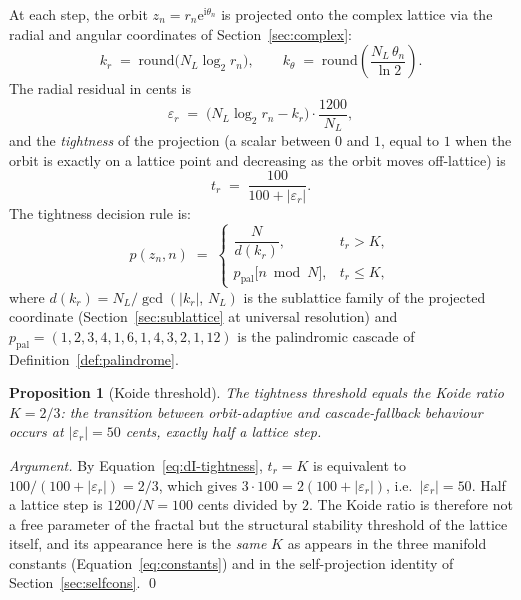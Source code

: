 \documentclass[11pt,a4paper]{article}
\newtheorem{proposition}[theorem]{Proposition}
\theoremstyle{definition}
\theoremstyle{remark}
\begin{document}
At each step, the orbit $z_{n}=r_{n}\mathrm{e}^{\mathrm{i}\theta_{n}}$ is projected onto the complex lattice via the radial and angular coordinates of Section~\ref{sec:complex}:
\begin{equation}
k_{r} \;=\; \mathrm{round}\bigl(N_{L}\log_{2}r_{n}\bigr), \qquad
k_{\theta} \;=\; \mathrm{round}\!\left(\frac{N_{L}\,\theta_{n}}{\ln 2}\right).
\end{equation}
The radial residual in cents is
\begin{equation}
\varepsilon_{r} \;=\; \bigl(N_{L}\log_{2}r_{n} - k_{r}\bigr)\cdot\frac{1200}{N_{L}},
\label{eq:dI-eps}
\end{equation}
and the \emph{tightness} of the projection (a scalar between $0$ and $1$, equal to $1$ when the orbit is exactly on a lattice point and decreasing as the orbit moves off-lattice) is
\begin{equation}
t_{r} \;=\; \frac{100}{100+|\varepsilon_{r}|}.
\label{eq:dI-tightness}
\end{equation}
The tightness decision rule is:
\[
p(z_{n},n) \;=\; \begin{cases}
\dfrac{N}{d(k_{r})}, & t_{r} > K, \\[0.8em]
p_{\mathrm{pal}}\!\bigl[n\bmod N\bigr], & t_{r} \leq K,
\end{cases}
\]
where $d(k_{r}) = N_{L}/\gcd(|k_{r}|,\,N_{L})$ is the sublattice family of the projected coordinate (Section~\ref{sec:sublattice} at universal resolution) and $p_{\mathrm{pal}}=(1,2,3,4,1,6,1,4,3,2,1,12)$ is the palindromic cascade of Definition~\ref{def:palindrome}.

\begin{proposition}[Koide threshold]\label{prop:koide-threshold}
The tightness threshold equals the Koide ratio $K=2/3$: the transition between orbit-adaptive and cascade-fallback behaviour occurs at $|\varepsilon_{r}| = 50$ cents, exactly half a lattice step.
\end{proposition}

\begin{proof}[Argument]
By Equation~\eqref{eq:dI-tightness}, $t_{r} = K$ is equivalent to $100/(100+|\varepsilon_{r}|) = 2/3$, which gives $3\cdot 100 = 2(100+|\varepsilon_{r}|)$, i.e.\ $|\varepsilon_{r}|=50$. Half a lattice step is $1200/N = 100$ cents divided by $2$. The Koide ratio is therefore not a free parameter of the fractal but the structural stability threshold of the lattice itself, and its appearance here is the \emph{same} $K$ as appears in the three manifold constants (Equation~\eqref{eq:constants}) and in the self-projection identity of Section~\ref{sec:selfcons}. \qed
\end{proof}
\end{document}
